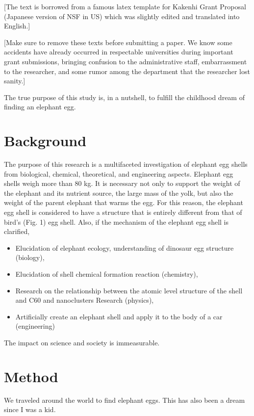 [The text is borrowed from a famous latex template for Kakenhi Grant
Proposal (Japanese version of NSF in US) which was slightly edited and translated into English.]

[Make sure to remove these texts before submitting a paper.
We know some accidents have already occurred in respectable universities during important grant submissions,
bringing confusion to the administrative staff, embarrassment to the researcher,
and some rumor among the department that the researcher lost sanity.]


The true purpose of this study is, in a nutshell, to fulfill the childhood dream of finding an elephant egg.

\section{Background}

The purpose of this research is
a multifaceted investigation of elephant egg shells from biological, chemical, theoretical, and engineering aspects.
Elephant egg shells weigh more than 80 kg.
It is necessary not only to support the weight of the elephant and its
nutrient source, the large mass of the yolk, but also the weight of the
parent elephant that warms the egg. For this reason, the elephant egg
shell is considered to have a structure that is entirely different
from that of bird's (Fig. 1) egg shell. Also, if the mechanism
of the elephant egg shell is clarified,

\begin{itemize}
 \item Elucidation of elephant ecology, understanding of dinosaur egg structure (biology),
 \item Elucidation of shell chemical formation reaction (chemistry),
 \item Research on the relationship between the atomic level structure of the shell and C60 and nanoclusters Research (physics),
 \item Artificially create an elephant shell and apply it to the body of a car (engineering)
\end{itemize}

The impact on science and society is immeasurable.

\section{Method}

We traveled around the world to find elephant eggs. This has also been a dream since I was a kid.

